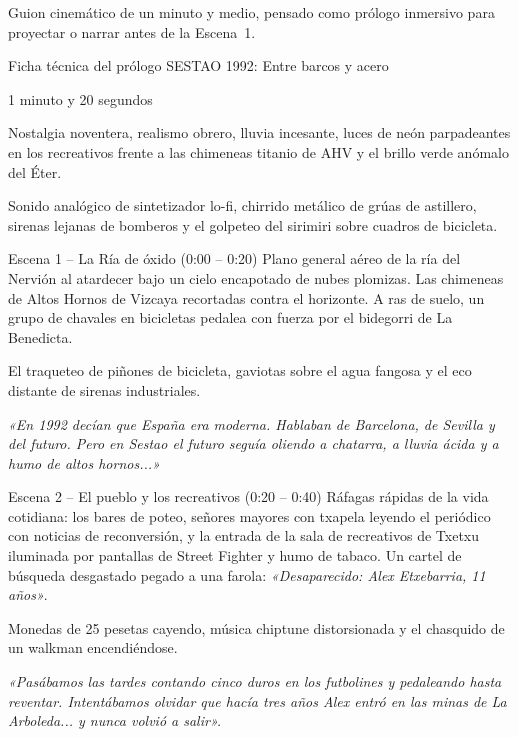 Guion cinemático de un minuto y medio, pensado como prólogo inmersivo para proyectar o narrar antes de la Escena~1.

\begin{CajaCinematica}{Ficha técnica del prólogo}
 SESTAO 1992: Entre barcos y acero\par
{} 1 minuto y 20 segundos\par
{} Nostalgia noventera, realismo obrero, lluvia incesante, luces de neón parpadeantes en los recreativos frente a las chimeneas titanio de AHV y el brillo verde anómalo del Éter.\par
{} Sonido analógico de sintetizador lo-fi, chirrido metálico de grúas de astillero, sirenas lejanas de bomberos y el golpeteo del sirimiri sobre cuadros de bicicleta.
\end{CajaCinematica}

\begin{CajaCinematica}{Escena 1 -- La Ría de óxido (0:00 -- 0:20)}
 Plano general aéreo de la ría del Nervión al atardecer bajo un cielo encapotado de nubes plomizas. Las chimeneas de Altos Hornos de Vizcaya recortadas contra el horizonte. A ras de suelo, un grupo de chavales en bicicletas pedalea con fuerza por el bidegorri de La Benedicta.\par
{} El traqueteo de piñones de bicicleta, gaviotas sobre el agua fangosa y el eco distante de sirenas industriales.\par
{}\par
\textit{«En 1992 decían que España era moderna. Hablaban de Barcelona, de Sevilla y del futuro. Pero en Sestao el futuro seguía oliendo a chatarra, a lluvia ácida y a humo de altos hornos...»}
\end{CajaCinematica}

\begin{CajaCinematica}{Escena 2 -- El pueblo y los recreativos (0:20 -- 0:40)}
 Ráfagas rápidas de la vida cotidiana: los bares de poteo, señores mayores con txapela leyendo el periódico con noticias de reconversión, y la entrada de la sala de recreativos de Txetxu iluminada por pantallas de Street Fighter y humo de tabaco. Un cartel de búsqueda desgastado pegado a una farola: \emph{«Desaparecido: Alex Etxebarria, 11 años»}.\par
{} Monedas de 25 pesetas cayendo, música chiptune distorsionada y el chasquido de un walkman encendiéndose.\par
{}\par
\textit{«Pasábamos las tardes contando cinco duros en los futbolines y pedaleando hasta reventar. Intentábamos olvidar que hacía tres años Alex entró en las minas de La Arboleda... y nunca volvió a salir».}
\end{CajaCinematica}

